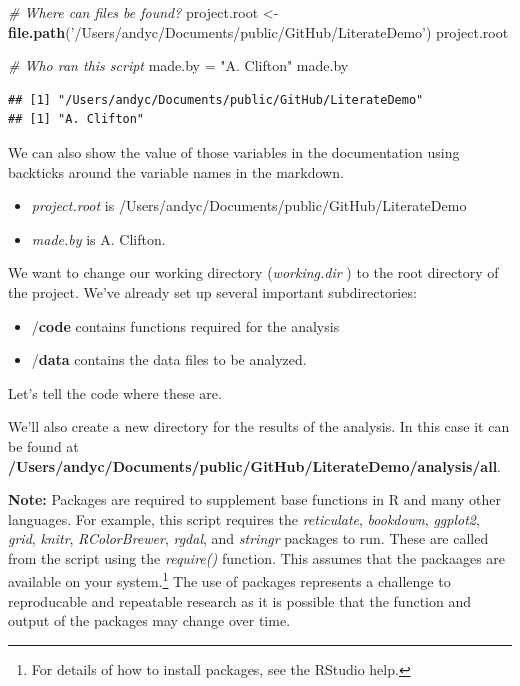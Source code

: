 \documentclass[11pt,]{article}
\newenvironment{Shaded}{\begin{snugshade}}{\end{snugshade}}
\newcommand{\CommentTok}[1]{\textcolor[rgb]{0.56,0.35,0.01}{\textit{#1}}}
\newcommand{\KeywordTok}[1]{\textcolor[rgb]{0.13,0.29,0.53}{\textbf{#1}}}
\newcommand{\NormalTok}[1]{#1}
\newcommand{\StringTok}[1]{\textcolor[rgb]{0.31,0.60,0.02}{#1}}
\providecommand{\tightlist}{%
  \setlength{\itemsep}{0pt}\setlength{\parskip}{0pt}}
\let\rmarkdownfootnote\footnote%
\def\footnote{\protect\rmarkdownfootnote}
\begin{document}
\begin{Shaded}
\begin{Highlighting}[]
\CommentTok{# Where can files be found?}
\NormalTok{project.root <-}\StringTok{ }\KeywordTok{file.path}\NormalTok{(}\StringTok{'/Users/andyc/Documents/public/GitHub/LiterateDemo'}\NormalTok{)}
\NormalTok{project.root}

\CommentTok{# Who ran this script}
\NormalTok{made.by =}\StringTok{ "A. Clifton"}
\NormalTok{made.by}
\end{Highlighting}
\end{Shaded}

\begin{verbatim}
## [1] "/Users/andyc/Documents/public/GitHub/LiterateDemo"
## [1] "A. Clifton"
\end{verbatim}

We can also show the value of those variables in the documentation using backticks around the variable names in the markdown.

\begin{itemize}
\tightlist
\item
  \emph{project.root} is /Users/andyc/Documents/public/GitHub/LiterateDemo
\item
  \emph{made.by} is A. Clifton.
\end{itemize}

We want to change our working directory (\emph{working.dir} ) to the root directory of the project. We've already set up several important subdirectories:

\begin{itemize}
\tightlist
\item
  /\textbf{code} contains functions required for the analysis
\item
  /\textbf{data} contains the data files to be analyzed.
\end{itemize}

Let's tell the code where these are.

We'll also create a new directory for the results of the analysis. In this case it can be found at \textbf{/Users/andyc/Documents/public/GitHub/LiterateDemo/analysis/all}.

\textbf{Note:} Packages are required to supplement base functions in R and many other languages. For example, this script requires the \emph{reticulate}, \emph{bookdown}, \emph{ggplot2}, \emph{grid}, \emph{knitr}, \emph{RColorBrewer}, \emph{rgdal}, and \emph{stringr} packages to run. These are called from the script using the \emph{require()} function. This assumes that the packaages are available on your system.\footnote{For details of how to install packages, see the RStudio help.} The use of packages represents a challenge to reproducable and repeatable research as it is possible that the function and output of the packages may change over time.
\end{document}

